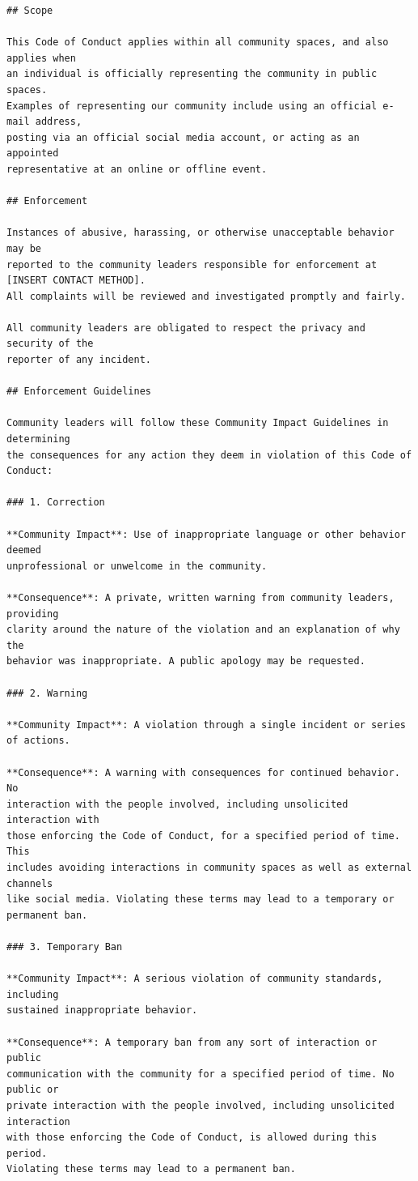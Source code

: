 \documentclass[
]{krantz}
\begin{document}
\begin{verbatim}
## Scope

This Code of Conduct applies within all community spaces, and also applies when
an individual is officially representing the community in public spaces.
Examples of representing our community include using an official e-mail address,
posting via an official social media account, or acting as an appointed
representative at an online or offline event.

## Enforcement

Instances of abusive, harassing, or otherwise unacceptable behavior may be
reported to the community leaders responsible for enforcement at
[INSERT CONTACT METHOD].
All complaints will be reviewed and investigated promptly and fairly.

All community leaders are obligated to respect the privacy and security of the
reporter of any incident.

## Enforcement Guidelines

Community leaders will follow these Community Impact Guidelines in determining
the consequences for any action they deem in violation of this Code of Conduct:

### 1. Correction

**Community Impact**: Use of inappropriate language or other behavior deemed
unprofessional or unwelcome in the community.

**Consequence**: A private, written warning from community leaders, providing
clarity around the nature of the violation and an explanation of why the
behavior was inappropriate. A public apology may be requested.

### 2. Warning

**Community Impact**: A violation through a single incident or series
of actions.

**Consequence**: A warning with consequences for continued behavior. No
interaction with the people involved, including unsolicited interaction with
those enforcing the Code of Conduct, for a specified period of time. This
includes avoiding interactions in community spaces as well as external channels
like social media. Violating these terms may lead to a temporary or
permanent ban.

### 3. Temporary Ban

**Community Impact**: A serious violation of community standards, including
sustained inappropriate behavior.

**Consequence**: A temporary ban from any sort of interaction or public
communication with the community for a specified period of time. No public or
private interaction with the people involved, including unsolicited interaction
with those enforcing the Code of Conduct, is allowed during this period.
Violating these terms may lead to a permanent ban.


\end{verbatim}
\end{document}
